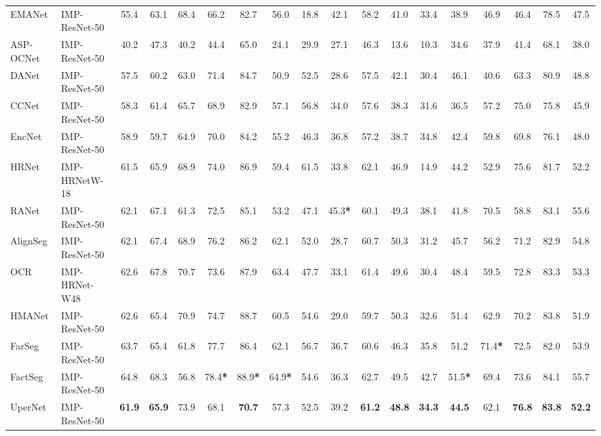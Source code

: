 \documentclass[10pt, journal,twoside]{IEEEtran}
\begin{document}
\begin{table*}[t]
\begin{threeparttable}
{\begin{tabular}{l|l|c|c|c|c|c|c|c|c|c|c|c|c|c|c|c|c}
  EMANet \cite{emanet} & IMP-ResNet-50 & 55.4 & 63.1 & 68.4 & 66.2 & 82.7 & 56.0 & 18.8 & 42.1 & 58.2 & 41.0 & 33.4 & 38.9 & 46.9 & 46.4 & 78.5 & 47.5 \\
  ASP-OCNet \cite{ocnet} & IMP-ResNet-50 & 40.2 & 47.3 & 40.2 & 44.4 & 65.0 & 24.1 & 29.9 & 27.1 & 46.3 & 13.6 & 10.3 & 34.6 & 37.9 & 41.4 & 68.1 & 38.0 \\
  DANet \cite{danet} & IMP-ResNet-50 & 57.5 & 60.2 & 63.0 & 71.4 & 84.7 & 50.9 & 52.5 & 28.6 & 57.5 & 42.1 & 30.4 & 46.1 & 40.6 & 63.3 & 80.9 & 48.8 \\
  CCNet \cite{ccnet} & IMP-ResNet-50 & 58.3 & 61.4 & 65.7 & 68.9 & 82.9 & 57.1 & 56.8 & 34.0 & 57.6 & 38.3 & 31.6  & 36.5 &  57.2 &  75.0 & 75.8 & 45.9 \\
  EncNet \cite{encnet} & IMP-ResNet-50 & 58.9 & 59.7 & 64.9 & 70.0 & 84.2 & 55.2 & 46.3 & 36.8 & 57.2 & 38.7 & 34.8 & 42.4 & 59.8 & 69.8 & 76.1 & 48.0 \\
  HRNet \cite{hrnet} & IMP-HRNetW-18 & 61.5 & 65.9 & 68.9 & 74.0 & 86.9 & 59.4 & 61.5 & 33.8 & 62.1 & 46.9 & 14.9 & 44.2 & 52.9 & 75.6 & 81.7 & 52.2 \\
  RANet \cite{asr_2019_cvpr_ranet} & IMP-ResNet-50 & 62.1 & 67.1 & 61.3 & 72.5 & 85.1 & 53.2 & 47.1 & 45.3\textbf{*} & 60.1 & 49.3 & 38.1 & 41.8 & 70.5 & 58.8 & 83.1 & 55.6 \\ 
  AlignSeg \cite{alignseg} & IMP-ResNet-50 & 62.1 & 67.4 & 68.9 & 76.2 & 86.2 & 62.1 & 52.0 & 28.7 & 60.7 & 50.3 & 31.2 & 45.7 & 56.2 & 71.2 & 82.9 & 54.8 \\
  OCR \cite{ocrnet} & IMP-HRNet-W48 & 62.6 & 67.8 & 70.7 & 73.6 & 87.9 & 63.4 & 47.7 & 33.1 & 61.4 & 49.6 & 30.4 & 48.4 & 59.5 & 72.8 & 83.3 & 53.3 \\
  HMANet \cite{hmanet} & IMP-ResNet-50 & 62.6 & 65.4 & 70.9 & 74.7 & 88.7 & 60.5 & 54.6 & 29.0 & 59.7 & 50.3 & 32.6 & 51.4 & 62.9 & 70.2 & 83.8 & 51.9 \\
  FarSeg \cite{farseg} & IMP-ResNet-50 & 63.7 & 65.4 & 61.8 & 77.7 & 86.4 & 62.1 & 56.7 & 36.7 & 60.6 & 46.3 & 35.8 & 51.2 & 71.4\textbf{*} & 72.5 & 82.0 & 53.9 \\
  FactSeg \cite{ass_2022_tgrs_factseg} & IMP-ResNet-50 & 64.8 & 68.3 & 56.8 & 78.4\textbf{*} & 88.9\textbf{*} & 64.9\textbf{*} & 54.6 & 36.3 & 62.7 & 49.5 & 42.7 & 51.5\textbf{*} & 69.4 & 73.6 & 84.1 & 55.7 \\
  \hline
  UperNet & IMP-ResNet-50 & \bfseries 61.9 & \bfseries 65.9 & 73.9 & 68.1 & \bfseries 70.7 & 57.3 & 52.5 & 39.2 & \bfseries 61.2 & \bfseries 48.8 & \bfseries 34.3 & \bfseries 44.5 & 62.1 & \bfseries 76.8 & \bfseries 83.8  & \bfseries 52.2 \\

\end{tabular}}
\end{threeparttable}
\end{table*}
\end{document}
